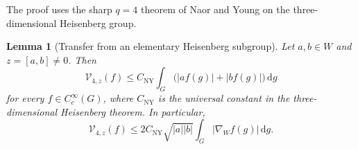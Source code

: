 \documentclass[11pt]{article}
\newtheorem{lemma}[theorem]{Lemma}
\theoremstyle{remark}
\newcommand{\dd}{\,\mathrm d}
\newcommand{\abs}[1]{\lvert #1\rvert}
\begin{document}
The proof uses the sharp \(q=4\) theorem of Naor and Young on the three-dimensional
Heisenberg group.

\begin{lemma}[Transfer from an elementary Heisenberg subgroup]\label{lem:H3-transfer}
Let \(a,b\in W\) and \(z=[a,b]\ne0\).  Then
\begin{equation}\label{eq:elementary-unbalanced}
 \mathcal V_{4,z}(f)
 \le C_{\mathrm{NY}}\int_G\bigl(\abs{af(g)}+\abs{bf(g)}\bigr)\dd g
\end{equation}
for every \(f\in C_c^\infty(G)\), where \(C_{\mathrm{NY}}\) is the universal constant
in the three-dimensional Heisenberg theorem.  In particular,
\begin{equation}\label{eq:elementary-balanced}
 \mathcal V_{4,z}(f)
 \le 2C_{\mathrm{NY}}\sqrt{\abs a\abs b}
 \int_G\abs{\nabla_W f(g)}\dd g.
\end{equation}
\end{lemma}
\end{document}
